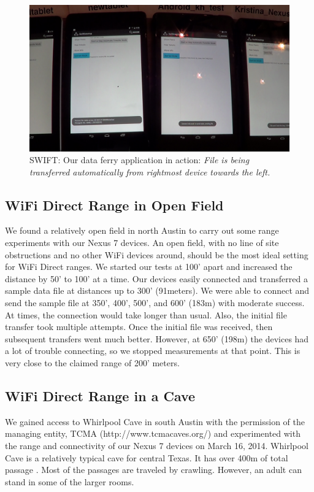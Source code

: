 \documentclass[10pt,twocolumn]{article}
\begin{document}
\label{sec:Data Ferry Experiment Results}
\begin{figure}[t]
\includegraphics[width=\textwidth]{swift_123}
\caption{SWIFT: Our data ferry application in action: \textit{File is being transferred automatically from rightmost device towards the left.}}
\label{fig:dataferry123}
\end{figure}

\subsection{WiFi Direct Range in Open Field}
\label{sec:WiFi Direct Range in Open Field}
We found a relatively open field in north Austin to carry out some range experiments with our Nexus 7 devices.
An open field, with no line of site obstructions and no other WiFi devices around, should be the most ideal setting for WiFi Direct ranges.
We started our tests at 100' apart and increased the distance by 50' to 100' at a time.
Our devices easily connected and transferred a sample data file at distances up to 300' (91meters). 
We were able to connect and send the sample file at 350', 400', 500', and 600' (183m) with moderate success. 
At times, the connection would take longer than usual.
Also, the initial file transfer took multiple attempts.
Once the initial file was received, then subsequent transfers went much better.
However, at 650' (198m) the devices had a lot of trouble connecting, so we stopped measurements at that point.
This is very close to the claimed range of 200' meters.

\subsection{WiFi Direct Range in a Cave}
\label{sec:WiFi Direct Range in a Cave}
We gained access to Whirlpool Cave in south Austin with the permission of the managing entity, TCMA (http://www.tcmacaves.org/) and experimented with the range and connectivity of our Nexus 7 devices on March 16, 2014.
Whirlpool Cave is a relatively typical cave for central Texas.
It has over 400m of total passage \cite{whirlpool}. 
Most of the passages are traveled by crawling.
However, an adult can stand in some of the larger rooms.
\end{document}
